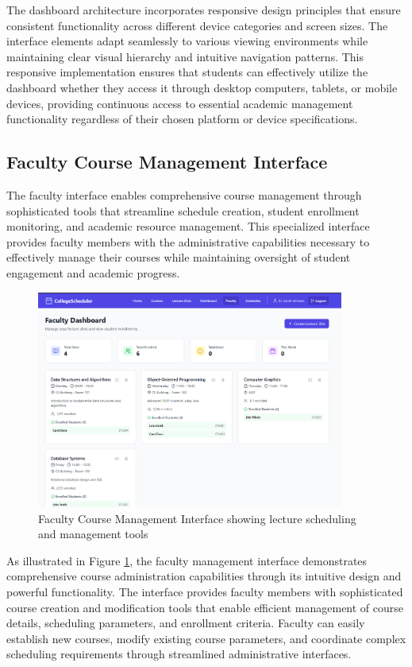 The dashboard architecture incorporates responsive design principles that ensure consistent functionality across different device categories and screen sizes. The interface elements adapt seamlessly to various viewing environments while maintaining clear visual hierarchy and intuitive navigation patterns. This responsive implementation ensures that students can effectively utilize the dashboard whether they access it through desktop computers, tablets, or mobile devices, providing continuous access to essential academic management functionality regardless of their chosen platform or device specifications.

\subsection{Faculty Course Management Interface}

The faculty interface enables comprehensive course management through sophisticated tools that streamline schedule creation, student enrollment monitoring, and academic resource management. This specialized interface provides faculty members with the administrative capabilities necessary to effectively manage their courses while maintaining oversight of student engagement and academic progress.

\begin{figure}[htbp]
    \centering
    \includegraphics[width=0.9\textwidth]{images/Screenshot of Faculty Lecture Management Page.png}
    \caption{Faculty Course Management Interface showing lecture scheduling and management tools}
    \label{fig:faculty_management}
\end{figure}

As illustrated in Figure \ref{fig:faculty_management}, the faculty management interface demonstrates comprehensive course administration capabilities through its intuitive design and powerful functionality. The interface provides faculty members with sophisticated course creation and modification tools that enable efficient management of course details, scheduling parameters, and enrollment criteria. Faculty can easily establish new courses, modify existing course parameters, and coordinate complex scheduling requirements through streamlined administrative interfaces.

